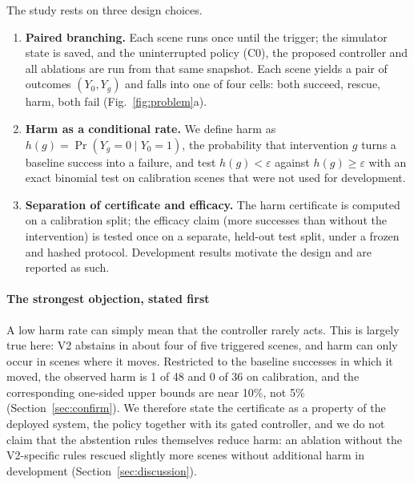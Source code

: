 The study rests on three design choices.
\begin{enumerate}
\item \textbf{Paired branching.} Each scene runs once until the trigger; the simulator state is saved, and the uninterrupted policy (C0), the proposed controller and all ablations are run from that same snapshot. Each scene yields a pair of outcomes $(Y_0, Y_g)$ and falls into one of four cells: both succeed, rescue, harm, both fail (Fig.~\ref{fig:problem}a).
\item \textbf{Harm as a conditional rate.} We define harm as $h(g)=\Pr(Y_g=0 \mid Y_0=1)$, the probability that intervention $g$ turns a baseline success into a failure, and test $h(g)<\varepsilon$ against $h(g)\ge\varepsilon$ with an exact binomial test on calibration scenes that were not used for development.
\item \textbf{Separation of certificate and efficacy.} The harm certificate is computed on a calibration split; the efficacy claim (more successes than without the intervention) is tested once on a separate, held-out test split, under a frozen and hashed protocol. Development results motivate the design and are reported as such.
\end{enumerate}

\paragraph{The strongest objection, stated first}
A low harm rate can simply mean that the controller rarely acts. This is largely true here: V2 abstains in about four of five triggered scenes, and harm can only occur in scenes where it moves. Restricted to the baseline successes in which it moved, the observed harm is 1 of 48 and 0 of 36 on calibration, and the corresponding one-sided upper bounds are near 10\%, not 5\% (Section~\ref{sec:confirm}). We therefore state the certificate as a property of the deployed system, the policy together with its gated controller, and we do not claim that the abstention rules themselves reduce harm: an ablation without the V2-specific rules rescued slightly more scenes without additional harm in development (Section~\ref{sec:discussion}).


